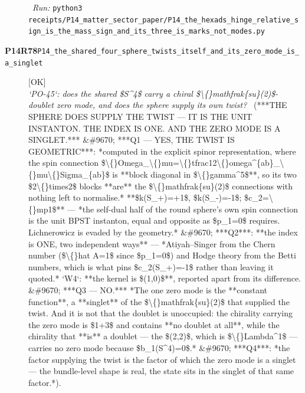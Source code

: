 \begin{description}
\ \emph{Run:} \texttt{python3 receipts/P14\_matter\_sector\_paper/P14\_the\_hexads\_hinge\_relative\_sign\_is\_the\_mass\_sign\_and\_its\_three\_is\_marks\_not\_modes.py}
\item[\rcptlabel{P14_the_shared_four_sphere_twists_itself_and_its_zero_mode_is_a_singlet}{P14R78}\textbf{P14R78}\quad\texttt{P14\_the\_shared\_four\_sphere\_twists\_itself\_and\_its\_zero\_mode\_is\_a\_singlet}]\hfill\textsf{[OK]}\\
\textit{`PO-45`: does the shared \$S\textasciicircum{}4\$ carry a chiral \$\textbackslash\{\}mathfrak\{su\}(2)\$-doublet zero mode, and does the sphere supply its own twist?} \ (***THE SPHERE DOES SUPPLY THE TWIST --- IT IS THE UNIT INSTANTON. THE INDEX IS ONE. AND THE ZERO MODE IS A SINGLET.*** \&\#9670; ***Q1 --- YES, THE TWIST IS GEOMETRIC***: *computed in the explicit spinor representation, where the spin connection \$\textbackslash\{\}Omega\_\textbackslash\{\}mu=\textbackslash\{\}tfrac12\textbackslash\{\}omega\textasciicircum{}\{ab\}\_\textbackslash\{\}mu\textbackslash\{\}Sigma\_\{ab\}\$ is **block diagonal in \$\textbackslash\{\}gamma\textasciicircum{}5\$**, so its two \$2\textbackslash\{\}times2\$ blocks **are** the \$\textbackslash\{\}mathfrak\{su\}(2)\$ connections with nothing left to normalise.* **\$k(S\_+)=+1\$, \$k(S\_-)=-1\$; \$c\_2=\textbackslash\{\}mp1\$** --- *the self-dual half of the round sphere's own spin connection is the unit BPST instanton, equal and opposite as \$p\_1=0\$ requires. Lichnerowicz is evaded by the geometry.* \&\#9670; ***Q2***: **the index is ONE, two independent ways** --- *Atiyah--Singer from the Chern number (\$\textbackslash\{\}hat A=1\$ since \$p\_1=0\$) and Hodge theory from the Betti numbers, which is what pins \$c\_2(S\_+)=-1\$ rather than leaving it quoted.* `W4`: **the kernel is \$(1,0)\$**, reported apart from its difference. \&\#9670;  ***Q3 --- NO.*** *The one zero mode is the **constant function**, a **singlet** of the \$\textbackslash\{\}mathfrak\{su\}(2)\$ that supplied the twist. And it is not that the doublet is unoccupied: the chirality carrying the zero mode is \$1+3\$ and contains **no doublet at all**, while the chirality that **is** a doublet --- the \$(2,2)\$, which is \$\textbackslash\{\}Lambda\textasciicircum{}1\$ --- carries no zero mode because \$b\_1(S\textasciicircum{}4)=0\$.* \&\#9670; ***Q4***: *the factor supplying the twist is the factor of which the zero mode is a singlet --- the bundle-level shape is real, the state sits in the singlet of that same factor.*). 

\end{description}
